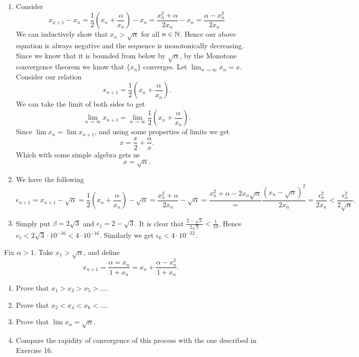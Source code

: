 \begin{solution}
  \begin{enumerate}[label=(\alph*)]
    \item Consider
      \[x_{n + 1} - x_n = \frac{1}{2}(x_n + \frac{\alpha}{x_n}) - x_n = \frac{x_n^2 + \alpha}{2x_n} - x_n = \frac{\alpha - x_n^2}{2x_n}\]
      We can inductively show that $x_n > \sqrt{\alpha}$ for all $n \in \mathbb{N}$.
      Hence our above equation is always negative and the sequence is monotonically decreasing.
      Since we know that it is bounded from below by $\sqrt{\alpha}$, by the Monotone convergence theorem we know that $\{x_n\}$ converges.
      Let $\lim_{n\to\infty} x_n = x$.
      Consider our relation
      \[x_{n + 1} = \frac{1}{2} (x_n + \frac{\alpha}{x_n}).\]
      We can take the limit of both sides to get
      \[\lim_{n\to\infty} x_{n + 1} = \lim_{n\to\infty} \frac{1}{2} (x_n + \frac{\alpha}{x_n}).\]
      Since $\lim x_n = \lim x_{n + 1}$, and using some properties of limits we get
      \[x = \frac{x}{2} + \frac{\alpha}{x}.\]
      Which with some simple algebra gets us
      \[x = \sqrt{\alpha}.\]
    \item We have the following
      \[\epsilon_{n + 1} = x_{n + 1} - \sqrt{\alpha} = \frac{1}{2}(x_n + \frac{\alpha}{x_n}) - \sqrt{\alpha} = \frac{x_n^2 + \alpha}{2x_n} - \sqrt{\alpha} = \frac{x_n^2 + \alpha - 2x_n\sqrt{\alpha}} = \frac{(x_n - \sqrt{\alpha})^2}{2x_n} = \frac{\epsilon_n^2}{2x_n} < \frac{\epsilon_n^2}{2\sqrt{\alpha}}.\]
    \item Simply put $\beta = 2\sqrt{3}$ and $\epsilon_1 = 2 - \sqrt{3}$.
      It is clear that $\frac{2 - \sqrt{3}}{2\sqrt{3}} < \frac{1}{10}$.
      Hence $\epsilon_5 < 2\sqrt{3} \cdot 10^{-16} < 4 \cdot 10^{-16}.$
      Similarly we get $\epsilon_6 < 4 \cdot 10^{-32}.$
  \end{enumerate}
\end{solution}

\begin{problem}
  Fix $\alpha > 1$.
  Take $x_1 > \sqrt{\alpha}$, and define
  \[x_{n + 1} = \frac{\alpha = x_n}{1 + x_n} = x_n + \frac{\alpha - x_n^2}{1 + x_n}.\]
  \begin{enumerate}[label=(\alph*)]
    \item Prove that $x_1 > x_3 > x_5 > \ldots$.
    \item Prove that $x_2 < x_4 < x_6 < \ldots$.
    \item Prove that $\lim x_n = \sqrt{\alpha}$.
    \item Compare the rapidity of convergence of this process with the one described in Exercise 16.
  \end{enumerate}
\end{problem}

